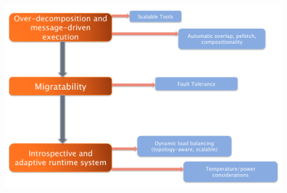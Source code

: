 \begin{frame}[fragile]
\includegraphics[width=0.9\textwidth]{figures/charmOutline.png}
\end{frame}

